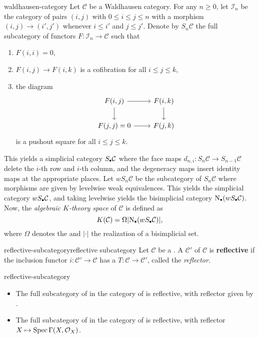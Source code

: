 \begin{example}{waldhausen-category}
    Let $\mathcal{C}$ be a Waldhausen category. For any $n \ge 0$, let $\mathcal{I}_n$ be the category of pairs $(i, j)$ with $0 \le i \le j \le n$ with a morphism $(i, j) \to (i', j')$ whenever $i \le i'$ and $j \le j'$. Denote by $S_n \mathcal{C}$ the full subcategory of functors $F \colon \mathcal{I}_n \to \mathcal{C}$ such that
    \begin{enumerate}[label=(\roman*)]
        \item $F(i, i) = 0$,
        \item $F(i, j) \to F(i, k)$ is a cofibration for all $i \le j \le k$,
        \item the diagram
        \[ \svg \begin{tikzcd} F(i, j) \arrow{r} \arrow{d} & F(i, k) \arrow{d} \\ F(j, j) = 0 \arrow{r} & F(j, k) \end{tikzcd} \]
        is a pushout square for all $i \le j \le k$.
    \end{enumerate}
    This yields a simplicial category $S_\bdot \mathcal{C}$ where the face maps $d_{n, i} \colon S_n \mathcal{C} \to S_{n - 1} \mathcal{C}$ delete the $i$-th row and $i$-th column, and the degeneracy maps insert identity maps at the appropriate places. Let $w S_n \mathcal{C}$ be the subcategory of $S_n \mathcal{C}$ where morphisms are given by levelwise weak equivalences. This yields the simplicial category $w S_\bdot \mathcal{C}$, and taking levelwise  yields the bisimplicial category $\textup{N}_\bdot(w S_\bdot \mathcal{C})$. Now, the \textit{algebraic $K$-theory space} of $\mathcal{C}$ is defined as
    \[ K(\mathcal{C}) = \Omega |\textup{N}_\bdot(w S_\bdot \mathcal{C})| , \]
    where $\Omega$ denotes the  and $|\cdot|$ the realization of a bisimplicial set.
\end{example}

\begin{topic}{reflective-subcategory}{reflective subcategory}
    Let $\mathcal{C}$ be a . A  $\mathcal{C}'$ of $\mathcal{C}$ is \textbf{reflective} if the inclusion functor $i \colon \mathcal{C}' \to \mathcal{C}$ has a  $T \colon \mathcal{C} \to \mathcal{C}'$, called the \textit{reflector}.
\end{topic}

\begin{example}{reflective-subcategory}
    \begin{itemize}
        \item The full subcategory of  in the category of  is reflective, with reflector given by .
        \item The full subcategory of  in the category of  is reflective, with reflector $X \mapsto \operatorname{Spec} \Gamma(X, \mathcal{O}_X)$.
    \end{itemize}
\end{example}
